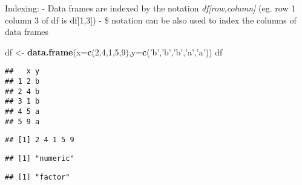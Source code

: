 \documentclass[]{article}
\newenvironment{Shaded}{\begin{snugshade}}{\end{snugshade}}
\newcommand{\KeywordTok}[1]{\textcolor[rgb]{0.13,0.29,0.53}{\textbf{{#1}}}}
\newcommand{\DataTypeTok}[1]{\textcolor[rgb]{0.13,0.29,0.53}{{#1}}}
\newcommand{\DecValTok}[1]{\textcolor[rgb]{0.00,0.00,0.81}{{#1}}}
\newcommand{\StringTok}[1]{\textcolor[rgb]{0.31,0.60,0.02}{{#1}}}
\newcommand{\CommentTok}[1]{\textcolor[rgb]{0.56,0.35,0.01}{\textit{{#1}}}}
\newcommand{\NormalTok}[1]{{#1}}
\begin{document}
Indexing: - Data frames are indexed by the notation
\emph{df{[}row,column{]}} (eg. row 1 column 3 of df is df{[}1,3{]}) - \$
notation can be also used to index the columns of data frames

\begin{Shaded}
\begin{Highlighting}[]
\NormalTok{df <-}\StringTok{ }\KeywordTok{data.frame}\NormalTok{(}\DataTypeTok{x=}\KeywordTok{c}\NormalTok{(}\DecValTok{2}\NormalTok{,}\DecValTok{4}\NormalTok{,}\DecValTok{1}\NormalTok{,}\DecValTok{5}\NormalTok{,}\DecValTok{9}\NormalTok{),}\DataTypeTok{y=}\KeywordTok{c}\NormalTok{(}\StringTok{'b'}\NormalTok{,}\StringTok{'b'}\NormalTok{,}\StringTok{'b'}\NormalTok{,}\StringTok{'a'}\NormalTok{,}\StringTok{'a'}\NormalTok{))}
\NormalTok{df}
\end{Highlighting}
\end{Shaded}

\begin{verbatim}
##   x y
## 1 2 b
## 2 4 b
## 3 1 b
## 4 5 a
## 5 9 a
\end{verbatim}

\begin{Shaded}
\end{Shaded}

\begin{verbatim}
## [1] 2 4 1 5 9
\end{verbatim}

\begin{Shaded}
\end{Shaded}

\begin{verbatim}
## [1] "numeric"
\end{verbatim}

\begin{Shaded}
\end{Shaded}

\begin{verbatim}
## [1] "factor"
\end{verbatim}
\end{document}
